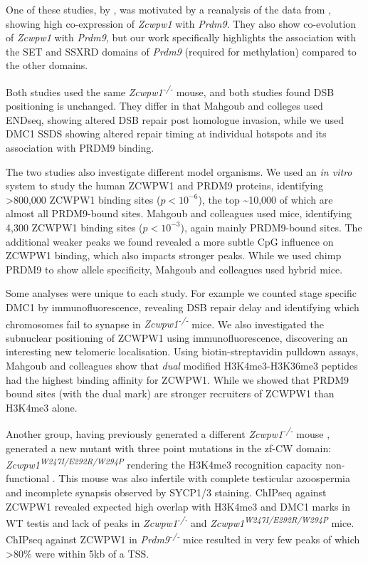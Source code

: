 One of these studies, by \cite{Mahgoub2019Dual}, was motivated by a reanalysis of the data from \cite{Chen2018Singlecell}, showing high co-expression of \textit{Zcwpw1} with \textit{Prdm9}. They also show co-evolution of \textit{Zcwpw1} with \textit{Prdm9}, but our work specifically highlights the association with the SET and SSXRD domains of \textit{Prdm9} (required for methylation) compared to the other domains.

Both studies used the same \textit{Zcwpw1\textsuperscript{-/-}} mouse, and both studies found DSB positioning is unchanged. They differ in that Mahgoub and colleges used ENDseq, showing altered DSB repair post homologue invasion, while we used DMC1 SSDS showing altered repair timing at individual hotspots and its association with PRDM9 binding.

The two studies also investigate different model organisms. We used an \textit{in vitro} system to study the human ZCWPW1 and PRDM9 proteins, identifying >800,000 ZCWPW1 binding sites ($p<10^{-6}$), the top \textasciitilde10,000 of which are almost all PRDM9-bound sites. Mahgoub and colleagues used mice, identifying 4,300 ZCWPW1 binding sites ($p<10^{-3}$), again mainly PRDM9-bound sites. The additional weaker peaks we found revealed a more subtle CpG influence on ZCWPW1 binding, which also impacts stronger peaks. While we used chimp PRDM9 to show allele specificity, Mahgoub and colleagues used hybrid mice.

Some analyses were unique to each study. For example we counted stage specific DMC1 by immunofluorescence, revealing DSB repair delay and identifying which chromosomes fail to synapse in \textit{Zcwpw1\textsuperscript{-/-}} mice. We also investigated the subnuclear positioning of ZCWPW1 using immunofluorescence, discovering an interesting new telomeric localisation. Using biotin-streptavidin pulldown assays, Mahgoub and colleagues show that \emph{dual} modified H3K4me3-H3K36me3 peptides had the highest binding affinity for ZCWPW1. While we showed that PRDM9 bound sites (with the dual mark) are stronger recruiters of ZCWPW1 than H3K4me3 alone.

Another group, having previously generated a different \textit{Zcwpw1\textsuperscript{-/-}} mouse \parencite{Li2019histone}, generated a new mutant with three point mutations in the zf-CW domain: \textit{Zcwpw1\textsuperscript{W247I/E292R/W294P}} rendering the H3K4me3 recognition capacity non-functional \parencite{Huang2019histone}. This mouse was also infertile with complete testicular azoospermia and incomplete synapsis observed by SYCP1/3 staining. ChIPseq against ZCWPW1 revealed expected high overlap with H3K4me3 and DMC1 marks in WT testis and lack of peaks in \textit{Zcwpw1\textsuperscript{-/-}} and \textit{Zcwpw1\textsuperscript{W247I/E292R/W294P}} mice. ChIPseq against ZCWPW1 in \textit{Prdm9\textsuperscript{-/-}} mice resulted in very few peaks of which >80\% were within 5kb of a TSS.

